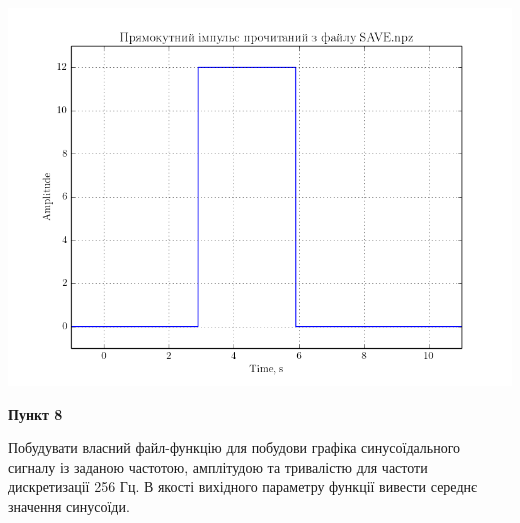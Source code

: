\documentclass[a4paper,12pt]{article}
\begin{document}
\begin{center}
{\includegraphics[height = 10 cm,width=13 cm]{7.png} }\\
\end{center}

\begin{center}
\textbf{Пункт 8}\par
\end{center}
 Побудувати власний файл-функцію для побудови графіка синусоїдального сигналу із заданою частотою, амплітудою та тривалістю для частоти дискретизації 256 Гц. В якості вихідного параметру функції вивести середнє значення синусоїди. \par
\end{document}

